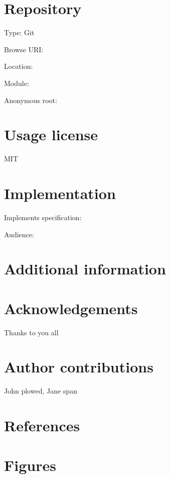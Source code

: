 \documentclass[
]{article}
\begin{document}
\hypertarget{repository}{%
\section{Repository}\label{repository}}

Type: Git

Browse URI:

Location:

Module:

Anonymous root:

\hypertarget{usage-license}{%
\section{Usage license}\label{usage-license}}

MIT

\hypertarget{implementation}{%
\section{Implementation}\label{implementation}}

Implements specification:

Audience:

\hypertarget{additional-information}{%
\section{Additional information}\label{additional-information}}

\hypertarget{acknowledgements}{%
\section{Acknowledgements}\label{acknowledgements}}

Thanks to you all

\hypertarget{author-contributions}{%
\section{Author contributions}\label{author-contributions}}

John plowed, Jane span

\hypertarget{references}{%
\section{References}\label{references}}

\hypertarget{figures}{%
\section{Figures}\label{figures}}
\end{document}
